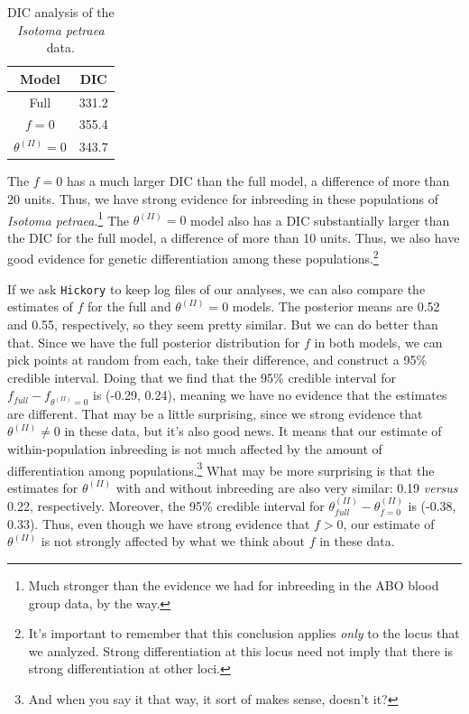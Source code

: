 \begin{table}
\begin{center}
\begin{tabular}{cc}
\hline\hline
Model & DIC \\
\hline
Full             & 331.2 \\
$f=0$            & 355.4 \\
$\theta^{(II)}=0$ & 343.7 \\
\hline
\end{tabular}
\caption{DIC analysis of the {\it Isotoma petraea\/}
    data.}\label{table:dic}
\end{center}
\end{table}

The $f=0$ has a much larger DIC than the full model, a difference of
more than 20 units. Thus, we have strong evidence for inbreeding in
these populations of {\it Isotoma petraea}.\footnote{Much stronger
  than the evidence we had for inbreeding in the ABO blood group data,
  by the way.} The $\theta^{(II)} = 0$ model also has a DIC
substantially larger than the DIC for the full model, a difference of
more than 10 units. Thus, we also have good evidence for genetic
differentiation among these populations.\footnote{It's important to
  remember that this conclusion applies {\it only\/} to the locus that
  we analyzed. Strong differentiation at this locus need not imply
  that there is strong differentiation at other loci.}

If we ask {\tt Hickory} to keep log files of our analyses, we can also
compare the estimates of $f$ for the full and $\theta^{(II)}=0$
models. The posterior means are 0.52 and 0.55, respectively, so they
seem pretty similar. But we can do better than that. Since we have the
full posterior distribution for $f$ in both models, we can pick points
at random from each, take their difference, and construct a 95\%
credible interval. Doing that we find that the 95\% credible interval
for $f_{full} - f_{\theta^{(II)}=0}$ is (-0.29, 0.24), meaning we have
no evidence that the estimates are different. That may be a little
surprising, since we strong evidence that $\theta^{(II)} \ne 0$ in
these data, but it's also good news. It means that our estimate of
within-population inbreeding is not much affected by the amount of
differentiation among populations.\footnote{And when you say it that
  way, it sort of makes sense, doesn't it?} What may be more
surprising is that the estimates for $\theta^{(II)}$ with and without
inbreeding are also very similar: 0.19 {\it versus\/} 0.22,
respectively. Moreover, the 95\% credible interval for
$\theta^{(II)}_{full} - \theta^{(II)}_{f=0}$ is (-0.38, 0.33). Thus,
even though we have strong evidence that $f > 0$, our estimate of
$\theta^{(II)}$ is not strongly affected by what we think about $f$ in
these data.

